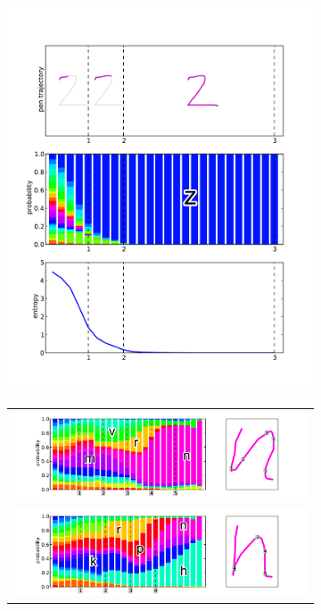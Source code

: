 \documentclass{sigchi}
\begin{document}
\begin{figure}
  \centering
  \begin{subfigure}[b]{0.35\textwidth}
    \includegraphics[width=\textwidth]{figures/entropy_z.pdf}
    \caption{}
    \label{fig:entropy_z}
  \end{subfigure}
  \begin{subfigure}[b]{0.45\textwidth}
    \begin{tabular}{c}
      \includegraphics[width=\textwidth]{figures/best_l1.pdf}\\
      \includegraphics[width=\textwidth]{figures/unclear_l1.pdf}\\

\end{tabular}
\end{subfigure}
\end{figure}
\end{document}
